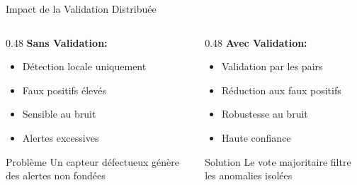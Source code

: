 \documentclass[aspectratio=169]{beamer}
\begin{document}
\begin{frame}{Impact de la Validation Distribuée}
    \begin{columns}[T]
        \begin{column}{0.48\textwidth}
            \textbf{Sans Validation:}
            \begin{itemize}
                \item Détection locale uniquement
                \item Faux positifs élevés
                \item Sensible au bruit
                \item Alertes excessives
            \end{itemize}
            
            \vspace{0.3cm}
            
            \begin{block}{Problème}
                Un capteur défectueux génère des alertes non fondées
            \end{block}
        \end{column}
        
        \begin{column}{0.48\textwidth}
            \textbf{Avec Validation:}
            \begin{itemize}
                \item Validation par les pairs
                \item Réduction aux faux positifs
                \item Robustesse au bruit
                \item Haute confiance
            \end{itemize}
            
            \vspace{0.3cm}
            
            \begin{alertblock}{Solution}
                Le vote majoritaire filtre les anomalies isolées
            \end{alertblock}
        \end{column}
    \end{columns}
\end{frame}
\end{document}
